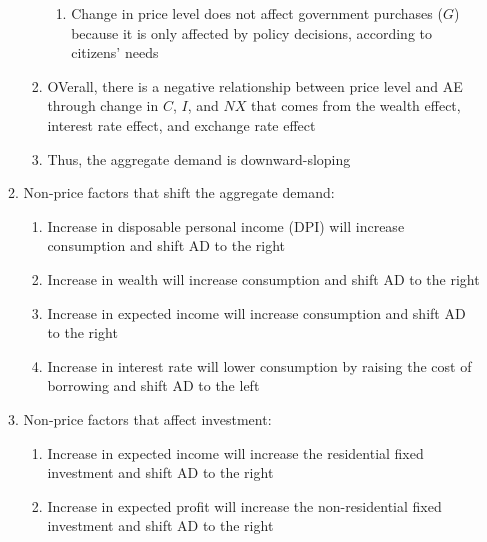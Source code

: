 \documentclass[12pt]{article}
\begin{document}
\begin{enumerate}
\begin{enumerate}
\begin{enumerate}
\begin{enumerate}
                  \item Change in price level does not affect government purchases ($G$) because it is only affected by policy decisions, according to citizens' needs

                \end{enumerate}

              \item OVerall, there is a negative relationship between price level and AE through change in $C$, $I$, and $NX$ that comes from the wealth effect, interest rate effect, and exchange rate effect

              \item Thus, the aggregate demand is downward-sloping

            \end{enumerate}

          \item Non-price factors that shift the aggregate demand:

            \begin{enumerate}

              \item Increase in disposable personal income (DPI) will increase consumption and shift AD to the right

              \item Increase in wealth will increase consumption and shift AD to the right

              \item Increase in expected income will increase consumption and shift AD to the right

              \item Increase in interest rate will lower consumption by raising the cost of borrowing and shift AD to the left

            \end{enumerate}

          \item Non-price factors that affect investment:

            \begin{enumerate}

              \item Increase in expected income will increase the residential fixed investment and shift AD to the right

              \item Increase in expected profit will increase the non-residential fixed investment and shift AD to the right


\end{enumerate}
\end{enumerate}
\end{enumerate}
\end{document}
